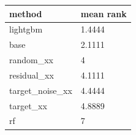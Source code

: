\begin{tabular}{ll}
\toprule
method & mean rank \\
\midrule
lightgbm & 1.4444 \\
base & 2.1111 \\
random\_xx & 4 \\
residual\_xx & 4.1111 \\
target\_noise\_xx & 4.4444 \\
target\_xx & 4.8889 \\
rf & 7 \\
\bottomrule
\end{tabular}
